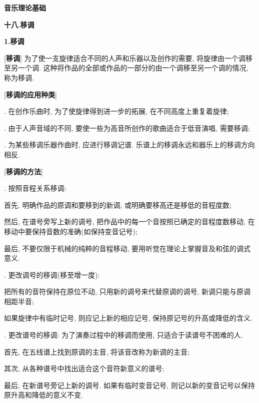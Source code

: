 

\begin{center} 
 \Large \textbf{音乐理论基础}\par
 \textbf{十八.移调}
\end{center}

\large 
\begin{center}
 \textbf{1.移调}\\
\end{center}

[\textbf{移调}] 为了使一支旋律适合不同的人声和乐器以及创作的需要, 将旋律由一个调移至另一个调. 这种将作品的全部或作品的一部分的由一个调移至另一个调的情况, 称为移调.\par

[\textbf{移调的应用种类}]\par
{}. 在创作乐曲时, 为了使旋律得到进一步的拓展, 在不同高度上重复着旋律;\par
{}. 由于人声音域的不同, 要使一些为高音所创作的歌曲适合于低音演唱, 需要移调;\par
{}. 为某些移调乐器作曲时, 应进行移调记谱. 乐谱上的移调永远和器乐上的移调方向相反.\par

[\textbf{移调的方法}]\par
{}. 按照音程关系移调:\par
\qquad \qquad 首先, 明确作品的原调和要移到的新调, 或明确要移高还是移低的音程度数;\par
\qquad \qquad 然后, 在谱号旁写上新的调号, 把作品中的每一个音按照已确定的音程度数移动, 在移动中要保持音数的准确(如保持变音记号);\par
\qquad \qquad 最后, 不要仅限于机械的纯粹的音程移动, 要用听觉在理论上掌握音及和弦的调式意义.\par
{}. 更改调号的移调(移至增一度):\par
\qquad \qquad 把所有的音符保持在原位不动, 只用新的调号来代替原调的调号, 新调只能与原调相距半音;\par
\qquad \qquad 如果旋律中有临时记号, 则应记上新的相应记号, 保持原记号的升高或降低的含义.\par
{}. 更改谱号的移调: 为了演奏过程中的移调而使用, 只适合于读谱号不困难的人.\par
\qquad \qquad 首先, 在五线谱上找到原调的主音, 将该音改称为新调的主音;\par
\qquad \qquad 其次, 从各种谱号中找出适合这个音符新意义的谱号;\par
\qquad \qquad 最后, 在新谱号旁记上新的调号. 如果有临时变音记号, 则记以新的变音记号以保持原升高和降低的意义不变.\par


